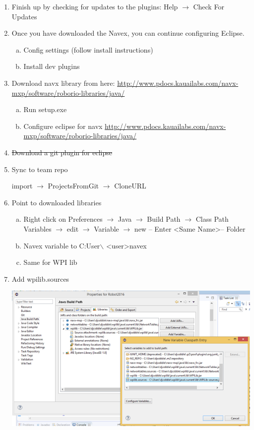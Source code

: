 \documentclass{article}
\begin{document}
\begin{enumerate}
        \item Finish up by checking for updates to the plugins: Help $\rightarrow$ Check For Updates

        \item Once you have downloaded the Navex, you can continue configuring Eclipse.
        \begin{enumerate}[(a)]
            \item Config settings (follow install instructions)
            \item Install dev plugins
        \end{enumerate}
        
    
    
    \item Download navx library from here: 
    \url{http://www.pdocs.kauailabs.com/navx-mxp/software/roborio-libraries/java/}
        \begin{enumerate}[(a)]
        \item Run setup.exe
        \item Configure eclipse for navx
        \url{http://www.pdocs.kauailabs.com/navx-mxp/software/roborio-libraries/java/}
        \end{enumerate}


    \item \st{Download a git plugin for eclipse}
    
    \item Sync to team repo
    
    import $\rightarrow$ ProjectsFromGit  $\rightarrow$  CloneURL

    \item Point to downloaded libraries
        \begin{enumerate}[(a)]
        \item Right click on Preferences $\rightarrow$ Java $\rightarrow$  Build Path  $\rightarrow$  Class Path Variables $\rightarrow$ edit $\rightarrow$ Variable $\rightarrow$ new -- Enter \textless Same Name\textgreater -- Folder 
        \item Navex variable to C:User$\backslash$ \textless user\textgreater navex
        \item Same for WPI lib
        \end{enumerate}
        
    \item Add wpilib.sources
    
    \includegraphics{7a.png}


\end{enumerate}
\end{document}
